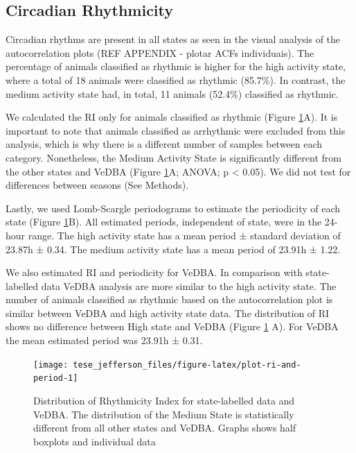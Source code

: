 \documentclass[msc,numbers,hidelinks]{coppe}
\begin{document}
  \hypertarget{circadian-rhythmicity}{%
  \subsection{Circadian Rhythmicity}\label{circadian-rhythmicity}}

  Circadian rhythms are present in all states as seen in the visual analysis of the autocorrelation plots (REF APPENDIX - plotar ACFs individuais). The percentage of animals classified as rhythmic is higher for the high activity state, where a total of 18 animals were classified as rhythmic (85.7\%). In contrast, the medium activity state had, in total, 11 animals (52.4\%) classified as rhythmic.

  We calculated the RI only for animals classified as rhythmic (Figure \ref{fig:plot-ri-and-period}A). It is important to note that animals classified as arrhythmic were excluded from this analysis, which is why there is a different number of samples between each category. Nonetheless, the Medium Activity State is significantly different from the other states and VeDBA (Figure \ref{fig:plot-ri-and-period}A; ANOVA; p \textless{} 0.05). We did not test for differences between seasons (See Methods).

  Lastly, we used Lomb-Scargle periodograms to estimate the periodicity of each state (Figure \ref{fig:plot-ri-and-period}B). All estimated periods, independent of state, were in the 24-hour range. The high activity state has a mean period ± standard deviation of 23.87h ± 0.34. The medium activity state has a mean period of 23.91h ± 1.22.

  We also estimated RI and periodicity for VeDBA. In comparison with state-labelled data VeDBA analysis are more similar to the high activity state. The number of animals classified as rhythmic based on the autocorrelation plot is similar between VeDBA and high activity state data. The distribution of RI shows no difference between High state and VeDBA (Figure \ref{fig:plot-ri-and-period} A). For VeDBA the mean estimated period was 23.91h ± 0.31.
  \begin{figure}[H]

  {\centering \texttt{[image: tese\_jefferson\_files/figure-latex/plot-ri-and-period-1]} 

  }

  \caption{Distribution of Rhythmicity Index for state-labelled data and VeDBA. The distribution of the Medium State is statistically different from all other states and VeDBA. Graphs shows half boxplots and individual data}\label{fig:plot-ri-and-period}
  \end{figure}
  \newpage
\end{document}
